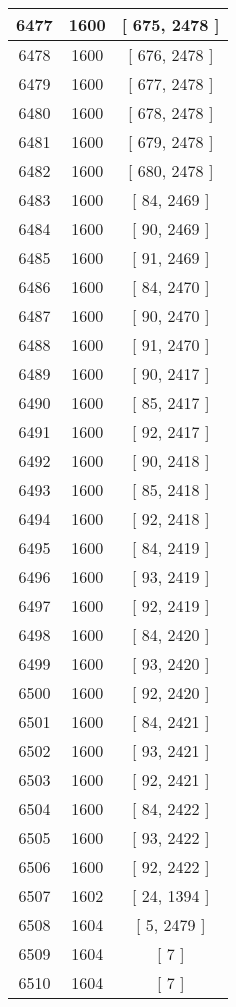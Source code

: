 \begin{center}
\begin{longtable}[H]{|| c c c ||}
\hline
6477 & 1600 & [ 675, 2478 ] \\ 
\hline
6478 & 1600 & [ 676, 2478 ] \\ 
\hline
6479 & 1600 & [ 677, 2478 ] \\ 
\hline
6480 & 1600 & [ 678, 2478 ] \\ 
\hline
6481 & 1600 & [ 679, 2478 ] \\ 
\hline
6482 & 1600 & [ 680, 2478 ] \\ 
\hline
6483 & 1600 & [ 84, 2469 ] \\ 
\hline
6484 & 1600 & [ 90, 2469 ] \\ 
\hline
6485 & 1600 & [ 91, 2469 ] \\ 
\hline
6486 & 1600 & [ 84, 2470 ] \\ 
\hline
6487 & 1600 & [ 90, 2470 ] \\ 
\hline
6488 & 1600 & [ 91, 2470 ] \\ 
\hline
6489 & 1600 & [ 90, 2417 ] \\ 
\hline
6490 & 1600 & [ 85, 2417 ] \\ 
\hline
6491 & 1600 & [ 92, 2417 ] \\ 
\hline
6492 & 1600 & [ 90, 2418 ] \\ 
\hline
6493 & 1600 & [ 85, 2418 ] \\ 
\hline
6494 & 1600 & [ 92, 2418 ] \\ 
\hline
6495 & 1600 & [ 84, 2419 ] \\ 
\hline
6496 & 1600 & [ 93, 2419 ] \\ 
\hline
6497 & 1600 & [ 92, 2419 ] \\ 
\hline
6498 & 1600 & [ 84, 2420 ] \\ 
\hline
6499 & 1600 & [ 93, 2420 ] \\ 
\hline
6500 & 1600 & [ 92, 2420 ] \\ 
\hline
6501 & 1600 & [ 84, 2421 ] \\ 
\hline
6502 & 1600 & [ 93, 2421 ] \\ 
\hline
6503 & 1600 & [ 92, 2421 ] \\ 
\hline
6504 & 1600 & [ 84, 2422 ] \\ 
\hline
6505 & 1600 & [ 93, 2422 ] \\ 
\hline
6506 & 1600 & [ 92, 2422 ] \\ 
\hline
6507 & 1602 & [ 24, 1394 ] \\ 
\hline
6508 & 1604 & [ 5, 2479 ] \\ 
\hline
6509 & 1604 & [ 7 ] \\ 
\hline
6510 & 1604 & [ 7 ] \\ 

\end{longtable}
\end{center}
